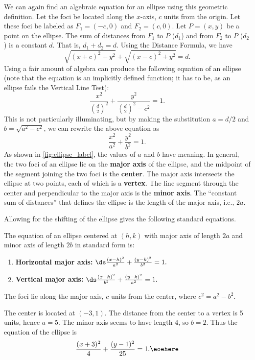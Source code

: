 We can again find an algebraic equation for an ellipse using this geometric definition. Let the foci be located along the $x$-axis, $c$ units from the origin. Let these foci be labeled as $F_1 = (-c,0)$ and $F_2=(c,0)$. Let $P=(x,y)$ be a point on the ellipse. The sum of distances from $F_1$ to $P$ ($d_1$) and from $F_2$ to $P$ ($d_2$) is a constant $d$. That is, $d_1+d_2=d$. Using the Distance Formula, we have 
$$\sqrt{(x+c)^2+y^2} + \sqrt{(x-c)^2+y^2} = d.$$ Using a fair amount of algebra can produce the following equation of an ellipse (note that the equation is an implicitly defined function; it has to be, as an ellipse fails the Vertical Line Test):
$$\frac{x^2}{\left(\frac d2\right)^2} + \frac{y^2}{\left(\frac d2\right)^2-c^2} = 1.$$
This is not particularly illuminating, but by making the substitution $a=d/2$ and $b=\sqrt{a^2-c^2}$, we can rewrite the above equation as 
$$\frac{x^2}{a^2} + \frac{y^2}{b^2} = 1.$$
As shown in \autoref{fig:ellipse_label}, the values of $a$ and $b$ have
meaning. %
In general, the two foci of an ellipse lie on the \textbf{major axis} of the ellipse, and the midpoint of the segment joining the two foci is the \textbf{center}. The major axis intersects the ellipse at two points, each of which is a \textbf{vertex}. The line segment through the center and perpendicular to the major axis is the \textbf{minor axis}. The ``constant sum of distances'' that defines the ellipse is the length of the major axis, i.e., $2a$.

Allowing for the shifting of the ellipse gives the following standard equations.
	
{The equation of an ellipse centered at $(h,k)$ with major axis of length $2a$ and minor axis of length $2b$ in standard form is:
\begin{enumerate}
	\item	\textbf{Horizontal major axis:} $\ds \frac{(x-h)^2}{a^2}+\frac{(y-k)^2}{b^2}=1.$
	\item	\textbf{Vertical major axis:} $\ds \frac{(x-h)^2}{b^2}+\frac{(y-k)^2}{a^2}=1.$
\end{enumerate}
The foci lie along the major axis, $c$ units from the center, where $c^2=a^2-b^2$.
}

{The center is located at $(-3,1)$. The distance from the center to a vertex is 5 units, hence $a=5$. The minor axis seems to have length 4, so $b=2$. Thus the equation of the ellipse is $$\frac{(x+3)^2}{4}+\frac{(y-1)^2}{25} = 1.\eoehere$$}

